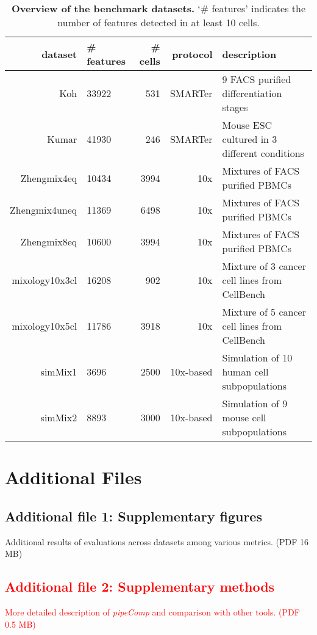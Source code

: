 \documentclass{bmcart}
\begin{document}
\begin{backmatter}
\begin{table}[h!]
\caption{\textbf{Overview of the benchmark datasets.} {\color{red}`\# features' indicates the number of features detected in at least 10 cells.}}
\label{tab:table1}
\begin{tabular}{rlrrl}
  \hline
dataset & {\color{red}\# features} & \# cells & protocol & description \\ 
  \hline
Koh & 33922 & 531 & SMARTer & 9 FACS purified differentiation stages \\ 
  Kumar & 41930 & 246 & SMARTer & Mouse ESC cultured in 3 different conditions \\ 
  Zhengmix4eq & 10434 & 3994 & 10x & Mixtures of FACS purified PBMCs \\ 
  Zhengmix4uneq & 11369 & 6498 & 10x & Mixtures of FACS purified PBMCs \\ 
  Zhengmix8eq & 10600 & 3994 & 10x & Mixtures of FACS purified PBMCs \\ 
  mixology10x3cl & 16208 & 902 & 10x & Mixture of 3  cancer cell lines from CellBench \\ 
  mixology10x5cl & 11786 & 3918 & 10x & Mixture of 5 cancer cell lines from CellBench \\ 
  simMix1 & 3696 & 2500 & 10x-based & Simulation of 10 human cell subpopulations \\
  simMix2 & 8893 & 3000 & 10x-based & Simulation of 9 mouse cell subpopulations \\
   \hline
\end{tabular}
\end{table}



\section*{Additional Files}
  \subsection*{\textbf{Additional file 1: Supplementary figures}}
  Additional results of evaluations across datasets among various metrics. (PDF 16 MB)
  \subsection*{\textcolor{red}{\textbf{Additional file 2: Supplementary methods}}}
  \textcolor{red}{More detailed description of \textit{pipeComp} and comparison with other tools. (PDF 0.5 MB)}
\end{backmatter}
\end{document}
